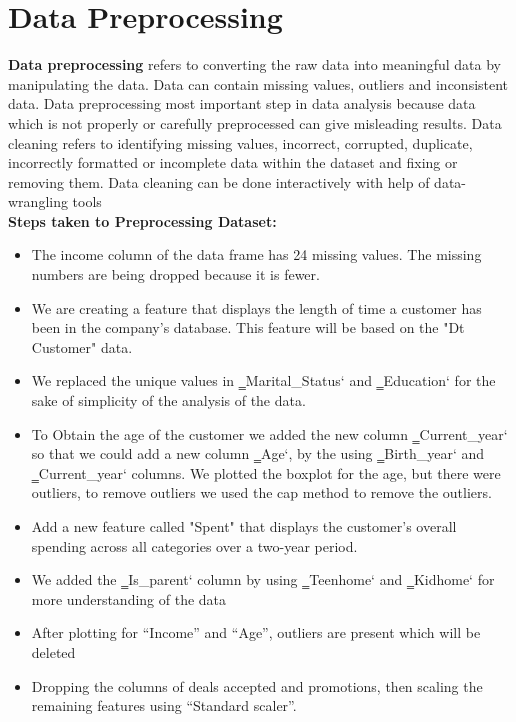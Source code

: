 \documentclass[12pt,a4paper]{report}
\begin{document}
\chapter{Data Preprocessing}
\textbf{Data preprocessing} refers to converting the raw data into meaningful data by
manipulating the data. Data can contain missing values, outliers and inconsistent data. Data
preprocessing most important step in data analysis because data which is not properly or
carefully preprocessed can give misleading results. Data cleaning refers to identifying
missing values, incorrect, corrupted, duplicate, incorrectly formatted or incomplete data
within the dataset and fixing or removing them. Data cleaning can be done interactively with
help of data-wrangling tools\\

\vspace{0,1cm}
\textbf{Steps taken to Preprocessing Dataset:}
\begin{itemize}
\item The income column of the data frame has 24 missing values. The missing numbers are
being dropped because it is fewer. 
\vspace{0,5cm}
\item We are creating a feature that displays the length of time a customer has been in the
company's database. This feature will be based on the "Dt Customer" data.
\vspace{0,5cm}
\item We replaced the unique values in ‗Marital\_Status‘ and ‗Education‘ for the sake of
simplicity of the analysis of the data.
\vspace{0,5cm}
\item To Obtain the age of the customer we added the new column ‗Current\_year‘ so that
we could add a new column ‗Age‘, by the using ‗Birth\_year‘ and ‗Current\_year‘
columns. We plotted the boxplot for the age, but there were outliers, to remove
outliers we used the cap method to remove the outliers.
\vspace{0,5cm}
\item Add a new feature called "Spent" that displays the customer's overall spending across all
categories over a two-year period.
\vspace{0,5cm}
\item We added the ‗Is\_parent‘ column by using ‗Teenhome‘ and ‗Kidhome‘ for more
understanding of the data
\vspace{0,5cm}
\item After plotting for “Income” and “Age”, outliers are present which will be deleted
\vspace{0,5cm}
\item Dropping the columns of deals accepted and promotions, then scaling the remaining
features using “Standard scaler”.




\end{itemize}
\end{document}
